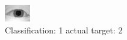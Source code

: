 \begin{figure}[h!]
\begin{center}
\includegraphics[width=0.60\columnwidth]{figures/ID861_class_1_target_2.png}
\end{center}
\caption{ Classification: 1 actual target: 2}
\label{fig:ID861_class_1_target_2}
\end{figure}
